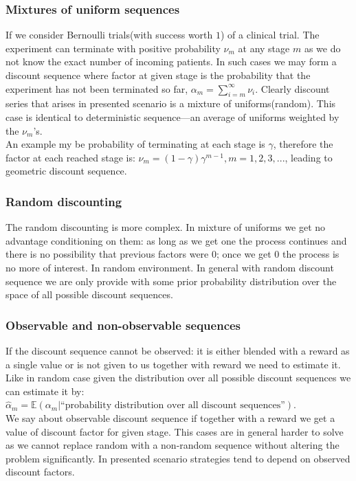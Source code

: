 \documentclass[12pt, a4paper, pdflatex, leqno]{report}
\begin{document}
\subsubsection{Mixtures of uniform sequences}
If we consider Bernoulli trials(with success worth $1$) of a clinical trial. The experiment can terminate with positive probability $\nu_m$ at any stage $m$ as we do not know the exact number of incoming patients. In such cases we may form a discount sequence where factor at given stage is the probability that the experiment has not been terminated so far, $\alpha_m = \sum_{i=m}^\infty \nu_i$. Clearly discount series that arises in presented scenario is a mixture of uniforms(random). This case is identical to deterministic sequence---an average of uniforms weighted by the $\nu_m$'s.\\
An example my be probability of terminating at each stage is $\gamma$, therefore the factor at each reached stage is: $\nu_m = (1-\gamma)\gamma^{m-1}, m=1,2,3,...$, leading to geometric discount sequence.

\subsubsection{Random discounting}
The random discounting is more complex. In mixture of uniforms we get no advantage conditioning on them: as long as we get one the process continues and there is no possibility that previous factors were $0$; once we get $0$ the process is no more of interest. In random environment. In general with random discount sequence we are only provide with some prior probability distribution over the space of all possible discount sequences.\\

\subsubsection{Observable and non-observable sequences}
If the discount sequence cannot be observed: it is either blended with a reward as a single value or is not given to us together with reward we need to estimate it. Like in random case given the distribution over all possible discount sequences we can estimate it by: $\hat{\alpha}_m = \mathbb{E}(\alpha_m | \text{``probability distribution over all discount sequences''})$.\\

We say about observable discount sequence if together with a reward we get a value of discount factor for given stage. This cases are in general harder to solve as we cannot replace random with a non-random sequence without altering the problem significantly. In presented scenario strategies tend to depend on observed discount factors.\\
\end{document}
